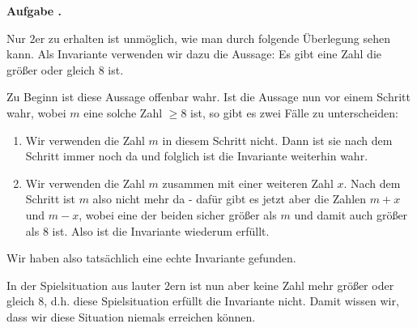\documentclass[a4paper,ngerman,12pt]{scrartcl}
\theoremstyle{definition}
\theoremstyle{plain}
\theoremstyle{remark}
\newlength{\aufgabenskip}
\newcounter{aufgabennummer}
\newenvironment{aufgabe}[1]{
	\addtocounter{aufgabennummer}{1}
	\textbf{Aufgabe \theaufgabennummer.} \emph{#1} \par
}{\vspace{\aufgabenskip}}
\begin{document}
\begin{aufgabe}{}
Nur $2$er zu erhalten ist unmöglich, wie man durch folgende Überlegung sehen kann. Als Invariante verwenden wir dazu die Aussage: \glqq Es gibt eine Zahl die größer oder gleich $8$ ist.\grqq

Zu Beginn ist diese Aussage offenbar wahr. Ist die Aussage nun vor einem Schritt wahr, wobei $m$ eine solche Zahl $\geq 8$ ist, so gibt es zwei Fälle zu unterscheiden:
\begin{enumerate}
	\item Wir verwenden die Zahl $m$ in diesem Schritt nicht. Dann ist sie nach dem Schritt immer noch da und folglich ist die Invariante weiterhin wahr. 
	\item Wir verwenden die Zahl $m$ zusammen mit einer weiteren Zahl $x$. Nach dem Schritt ist $m$ also nicht mehr da - dafür gibt es jetzt aber die Zahlen $m+x$ und $m-x$, wobei eine der beiden sicher größer als $m$ und damit auch größer als $8$ ist. Also ist die Invariante wiederum erfüllt.
\end{enumerate}
Wir haben also tatsächlich eine echte Invariante gefunden. 

In der Spielsituation aus lauter $2$ern ist nun aber keine Zahl mehr größer oder gleich $8$, d.h. diese Spielsituation erfüllt die Invariante nicht. Damit wissen wir, dass wir diese Situation niemals erreichen können.


\end{aufgabe}
\end{document}
